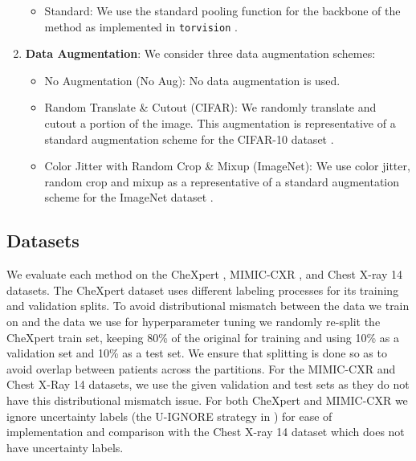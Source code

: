 \begin{enumerate}
\begin{itemize}
            \item Standard: We use the standard pooling function for the backbone of the method as implemented in \texttt{torvision} \citep{paszke2019pytorch}.
        \end{itemize}
    \item \textbf{Data Augmentation}: We consider three data augmentation schemes: 
        \begin{itemize}
            \item No Augmentation (No Aug): No data augmentation is used.
            \item Random Translate \& Cutout (CIFAR): We randomly translate and cutout a portion of the image. This augmentation is representative of a standard augmentation scheme for the CIFAR-10 dataset \citep{krizhevsky2009learning}. 
            \item Color Jitter with Random Crop \& Mixup (ImageNet): We use color jitter, random crop and mixup \citep{zhang2017mixup} as a representative of a standard augmentation scheme for the ImageNet dataset \citep{deng2009imagenet}.
        \end{itemize} 
   \end{enumerate}

\subsection{Datasets}

We evaluate each method on the CheXpert \citep{irvin2019chexpert}, MIMIC-CXR \citep{johnson2019mimic}, and Chest X-ray 14 \citep{wang2017chestx} datasets\footnotemark{}. The CheXpert dataset uses different labeling processes for its training and validation splits. To avoid distributional mismatch between the data we train on and the data we use for hyperparameter tuning we randomly re-split the CheXpert train set, keeping 80\% of the original for training and using 10\% as a validation set and 10\% as a test set. We ensure that splitting is done so as to avoid overlap between patients across the partitions. For the MIMIC-CXR and Chest X-Ray 14 datasets, we use the given validation and test sets as they do not have this distributional mismatch issue. For both CheXpert and MIMIC-CXR we ignore uncertainty labels (the U-IGNORE strategy in \citet{irvin2019chexpert}) for ease of implementation and comparison with the Chest X-ray 14 dataset which does not have uncertainty labels.
